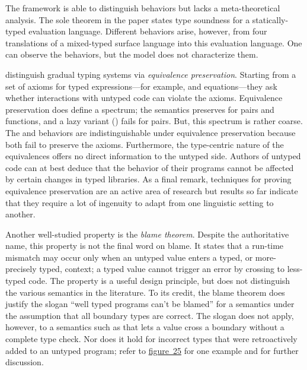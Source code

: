 \documentclass[ twoside,open=right,titlepage,numbers=noenddot,headinclude,%
                footinclude=true,cleardoublepage=empty,abstract=off,
                BCOR=5mm,paper=a4,fontsize=11pt,%
                ngerman,american,%
                parts,pdfspacing]{scrreprt}
\newcommand{\FigureRef}[2]{#1}
\begin{document}
The \relax{\kafka{}} framework is able to
 distinguish behaviors but lacks a meta{-}theoretical analysis.
The sole theorem in the paper states type soundness for a statically{-}typed
 evaluation language.
Different behaviors arise, however, from four translations of a mixed{-}typed
 surface language into this evaluation language.
One can observe the behaviors, but the model does not characterize them.

 distinguish gradual typing systems via \emph{equivalence preservation}.
Starting from a set of axioms for typed expressions{---}for
 example, \relax{$\beta$} and \relax{$\eta$} equations{---}they ask whether interactions with
 untyped code can violate the axioms.
Equivalence preservation does define a spectrum;
 the \relax{\nname} semantics preserves \relax{$\eta$} for pairs and functions,
 and a lazy variant (\relax{\cname}) fails for pairs.
But, this spectrum is rather coarse.
The \relax{\tname} and \relax{\ename} behaviors are indistinguishable under
 equivalence preservation because both fail to preserve the axioms.
Furthermore, the type{-}centric nature of the equivalences offers no direct
 information to the untyped side.
Authors of untyped code can at best deduce that the behavior of their programs
 cannot be affected by certain changes in typed libraries.
As a final remark, techniques for proving equivalence preservation are an
 active area of research but results so far indicate that they require a lot of
 ingenuity to adapt from one linguistic setting to another.

Another well{-}studied property is the \emph{blame theorem}.
Despite the authoritative name, this property is not the final word on blame.
It states that a run{-}time mismatch may occur only when an untyped value enters
a typed, or more{-}precisely typed, context; a typed value cannot trigger an error by
crossing to less{-}typed code.  The property is a useful design principle, but
does not distinguish the various semantics in the literature.
To its credit, the blame theorem does justify the slogan {``}well typed programs can{'}t be blamed{''}
 for a \relax{\nname} semantics under the assumption that all boundary types are correct.
The slogan does not apply, however, to a semantics such as \relax{\tname} that lets a
value cross a boundary without a complete type check.
Nor does it hold for incorrect types that were retroactively added to an
untyped program; refer to \hyperref[t:x28counter_x28x22figurex22_x22figx3atrx2dexamplex22x29x29]{figure~\FigureRef{25}{t:x28counter_x28x22figurex22_x22figx3atrx2dexamplex22x29x29}} for
one example and  for further discussion.
\end{document}
